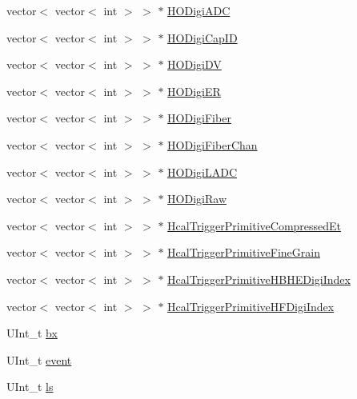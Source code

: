 \begin{DoxyCompactItemize}
\item 
vector$<$ vector$<$ int $>$ $>$ $\ast$ \hyperlink{class_hcal_tuple_tree_a66f1270b14c4fcf3c3c2152414aa867d}{H\+O\+Digi\+A\+D\+C}
\item 
vector$<$ vector$<$ int $>$ $>$ $\ast$ \hyperlink{class_hcal_tuple_tree_a81df879ffcc93b380edb13aaea8eb689}{H\+O\+Digi\+Cap\+I\+D}
\item 
vector$<$ vector$<$ int $>$ $>$ $\ast$ \hyperlink{class_hcal_tuple_tree_a12d79c1f523b7762cba3fb3e7f9a6290}{H\+O\+Digi\+D\+V}
\item 
vector$<$ vector$<$ int $>$ $>$ $\ast$ \hyperlink{class_hcal_tuple_tree_a541ae5ada795a82a8309b0d3e06a53a3}{H\+O\+Digi\+E\+R}
\item 
vector$<$ vector$<$ int $>$ $>$ $\ast$ \hyperlink{class_hcal_tuple_tree_af0fe6322bab84267ca6092eef461829f}{H\+O\+Digi\+Fiber}
\item 
vector$<$ vector$<$ int $>$ $>$ $\ast$ \hyperlink{class_hcal_tuple_tree_a558b32faee67ce93024ef6b65d39eea8}{H\+O\+Digi\+Fiber\+Chan}
\item 
vector$<$ vector$<$ int $>$ $>$ $\ast$ \hyperlink{class_hcal_tuple_tree_af5bd84878d749154d56e72a85ea99291}{H\+O\+Digi\+L\+A\+D\+C}
\item 
vector$<$ vector$<$ int $>$ $>$ $\ast$ \hyperlink{class_hcal_tuple_tree_ad1871cbc92384941dfc7824c9d3066ea}{H\+O\+Digi\+Raw}
\item 
vector$<$ vector$<$ int $>$ $>$ $\ast$ \hyperlink{class_hcal_tuple_tree_a34ce7962d072f721b08f74274f1559e4}{Hcal\+Trigger\+Primitive\+Compressed\+Et}
\item 
vector$<$ vector$<$ int $>$ $>$ $\ast$ \hyperlink{class_hcal_tuple_tree_ab3e76e89779572ff1a02dd94167df44c}{Hcal\+Trigger\+Primitive\+Fine\+Grain}
\item 
vector$<$ vector$<$ int $>$ $>$ $\ast$ \hyperlink{class_hcal_tuple_tree_af6d68e4006a3145f25130b4f5a3fb600}{Hcal\+Trigger\+Primitive\+H\+B\+H\+E\+Digi\+Index}
\item 
vector$<$ vector$<$ int $>$ $>$ $\ast$ \hyperlink{class_hcal_tuple_tree_ad552a76a8e3b13e2302f8f8c651170b1}{Hcal\+Trigger\+Primitive\+H\+F\+Digi\+Index}
\item 
U\+Int\+\_\+t \hyperlink{class_hcal_tuple_tree_ac8b12f3fd8e1a7f7c17f96de2b7df6d0}{bx}
\item 
U\+Int\+\_\+t \hyperlink{class_hcal_tuple_tree_acf307d3c7425105ab941eaf2b06e5941}{event}
\item 
U\+Int\+\_\+t \hyperlink{class_hcal_tuple_tree_a6a440ac41ccfdf350de9344c160cd2d4}{ls}
\item 

\end{DoxyCompactItemize}
